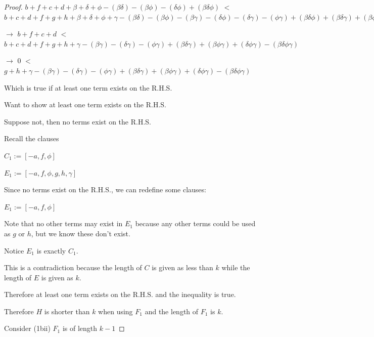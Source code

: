 \documentclass[manuscript]{acmart}
\begin{document}
\begin{proof}
        $b + f + c + d 
        + \beta + \delta + \phi
        - (\beta \delta) - (\beta \phi) - (\delta \phi)
        + (\beta \delta \phi) $
        $<$
        $b + c + d + f + g + h 
        + \beta + \delta + \phi + \gamma
        - (\beta \delta) - (\beta \phi) - (\beta \gamma) - (\delta \phi) - (\delta \gamma) - (\phi \gamma)
        + (\beta \delta \phi) + (\beta \delta \gamma) + (\beta \phi \gamma) + (\delta \phi \gamma)
        - (\beta \delta \phi \gamma)
        $

        $\rightarrow$
        $b + f + c + d$
        $<$
        $b + c + d + f + g + h 
        + \gamma
        - (\beta \gamma) - (\delta \gamma) - (\phi \gamma)
        + (\beta \delta \gamma) + (\beta \phi \gamma) + (\delta \phi \gamma)
        - (\beta \delta \phi \gamma)
        $

        $\rightarrow$
        $0$
        $<$
        $g + h 
        + \gamma
        - (\beta \gamma) - (\delta \gamma) - (\phi \gamma)
        + (\beta \delta \gamma) + (\beta \phi \gamma) + (\delta \phi \gamma)
        - (\beta \delta \phi \gamma)
        $

        Which is true if at least one term exists on the R.H.S.

        Want to show at least one term exists on the R.H.S.

        Suppose not, then no terms exist on the R.H.S.

        Recall the clauses

        $C_1 := [-a, f, \phi]$

        $E_1 := [-a, f, \phi, g, h, \gamma]$

        Since no terms exist on the R.H.S., we can redefine some clauses:

        $E_1 := [-a, f, \phi]$

        Note that no other terms may exist in $E_1$ because any other terms could be used as $g$ or $h$, but we know these don't exist.

        Notice $E_1$ is exactly $C_1$.

        This is a contradiction because the length of $C$ is given as less than $k$ while the length of $E$ is given as $k$.

        Therefore at least one term exists on the R.H.S. and the inequality is true.

        Therefore $H$ is shorter than $k$ when using $F_1$ and the length of $F_1$ is $k$.

        Consider (1bii) $F_1$ is of length $k-1$


\end{proof}
\end{document}
